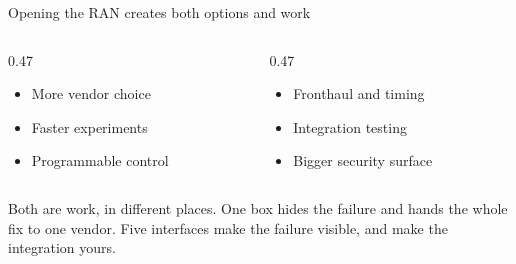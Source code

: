 \begin{frame}{Opening the RAN creates both options and work}
  \begin{columns}[T,onlytextwidth]
    \begin{column}{0.47\textwidth}
      \begin{tcolorbox}[colback=green!5,colframe=softgreen,title=Options]
        \small
        \begin{itemize}\itemsep4pt
          \item More vendor choice
          \item Faster experiments
          \item Programmable control
        \end{itemize}
      \end{tcolorbox}
    \end{column}
    \begin{column}{0.47\textwidth}
      \begin{tcolorbox}[colback=orange!6,colframe=coreorange,title=Work]
        \small
        \begin{itemize}\itemsep4pt
          \item Fronthaul and timing
          \item Integration testing
          \item Bigger security surface
        \end{itemize}
      \end{tcolorbox}
    \end{column}
  \end{columns}

     {Both are work, in different places. One box hides the failure and hands the
      whole fix to one vendor. Five interfaces make the failure visible, and make
      the integration yours.}
\end{frame}
